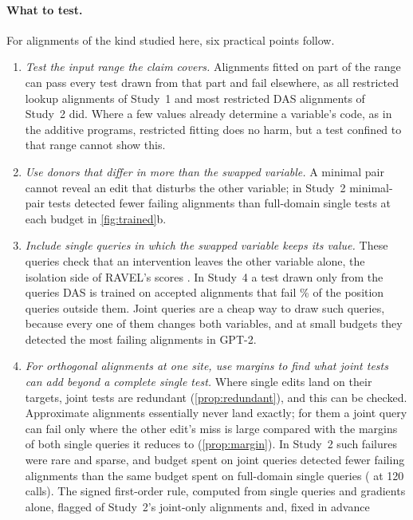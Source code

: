 \paragraph{What to test.}
For alignments of the kind studied here, six practical points follow.
\begin{enumerate}
  \item \emph{Test the input range the claim covers.} Alignments fitted on part of the range can pass every test
  drawn from that part and fail elsewhere, as all restricted lookup alignments of Study~1 and most restricted DAS
  alignments of Study~2 did. Where a few values already determine a variable's code, as in the additive programs,
  restricted fitting does no harm, but a test confined to that range cannot show this.
  \item \emph{Use donors that differ in more than the swapped variable.} A minimal pair cannot reveal an edit that
  disturbs the other variable; in Study~2 minimal-pair tests detected fewer failing alignments than full-domain
  single tests at each budget in \cref{fig:trained}b.
  \item \emph{Include single queries in which the swapped variable keeps its value.} These queries check that an
  intervention leaves the other variable alone, the isolation side of RAVEL's scores \citep{huang2024ravel}. In
  Study~4 a test drawn only from the queries DAS is trained on accepted alignments that fail \RateUnchangedAS\% of the
  position queries outside them. Joint queries are a cheap way to draw such queries, because every one of them changes
  both variables, and at small budgets they detected the most failing alignments in GPT-2.
  \item \emph{For orthogonal alignments at one site, use margins to find what joint tests can add beyond a complete
  single test.} Where single edits land on their targets, joint tests are redundant (\cref{prop:redundant}), and
  this can be checked. Approximate alignments essentially never land exactly; for them a joint query can fail only
  where the other edit's miss is large compared with the margins of both single queries it reduces to
  (\cref{prop:margin}). In Study~2 such failures were rare and sparse, and budget spent on joint queries detected
  fewer failing alignments than the same budget spent on full-domain single queries (\TrnContrastOneTwenty{}
  \TrnContrastOneTwentyCI{} at 120 calls). The signed first-order rule, computed from single queries and gradients
  alone, flagged \TrnMbRuleFlagged{} of Study~2's \TrnPerfectJointFailWord{} joint-only alignments and, fixed in advance

\end{enumerate}
